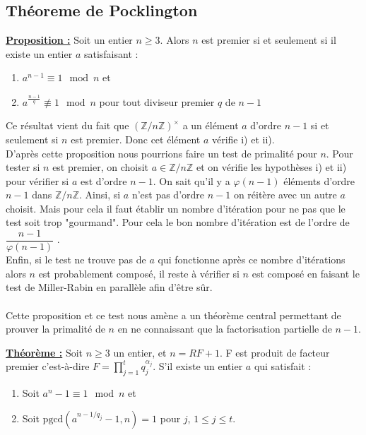 \subsection{Théoreme de Pocklington}

\underline{\textbf{Proposition :}}
Soit un entier $n\geq3$. Alors $n$ est premier si et seulement si il existe un entier $a$ satisfaisant : 

\begin{enumerate}[label=\roman*)]
 \item $a^{n-1} \equiv 1 \mod n $ et
 \item  $a^{\frac{n-1}{q}} \not \equiv 1 \mod n$ pour tout diviseur premier $q$ de $n-1$
\end{enumerate}

Ce résultat vient du fait que $(\mathbb {Z} /n\mathbb {Z} )^{\times }$ a un élément $a$ d'ordre $n-1$ si et seulement si $n$ est premier. Donc cet élément $a$ vérifie i) et ii).\\ D'après cette proposition nous pourrions faire un test de primalité pour $n$. Pour tester si $n$ est premier, on choisit $a \in \mathbb{Z}/n\mathbb{Z}$ et on vérifie les hypothèses i) et ii) pour vérifier si $a$ est d'ordre $n-1$. On sait qu'il y a $\varphi(n-1)$ éléments d'ordre $n-1$ dans $ \mathbb{Z}/n\mathbb{Z}$. Ainsi, si $a$ n'est pas d'ordre $n-1$ on réitère avec un autre $a$ choisit. Mais pour cela il faut établir un nombre d'itération pour ne pas que le test soit trop "gourmand". Pour cela le bon nombre d'itération est de l'ordre de $\dfrac{n-1}{\varphi(n-1)}$ .\\ Enfin, si le test ne trouve pas de $a$ qui fonctionne après ce nombre d'itérations alors $n$ est probablement composé, il reste à vérifier si $n$ est composé en faisant le test de Miller-Rabin en parallèle afin d'être sûr.
\\ \\
Cette proposition et ce test nous amène a un théorème central permettant de prouver la primalité de $n$ en ne connaissant que la factorisation partielle de $n-1$.

\underline{\textbf{Théorème :}}
Soit $n \geq 3$ un entier, et $n=RF+1$.  F est produit de facteur premier c’est-à-dire $F=\prod\limits_{j=1}^t q_j^{\alpha_j}$. S'il existe un entier $a$ qui satisfait :

\begin{enumerate}[label=\roman*)]
 \item   Soit $a^n-1 \equiv 1 \mod n$ et
 \item   Soit $ \text{pgcd}(a^{n-1/q_j} -1,n)=1$ pour $j$, $1\leq j \leq t$.
\end{enumerate}

